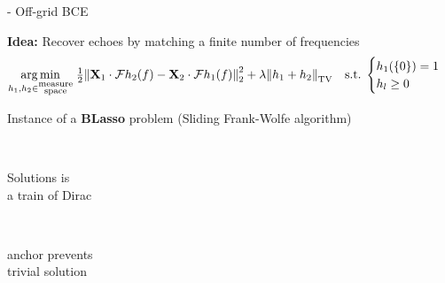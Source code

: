 \begin{frame}{\blaster - Off-grid BCE}
        \begin{block}{\textbf{Idea:} Recover echoes by matching a finite number of frequencies}
        \begin{equation*}
            \underset{h_1,h_2 \in \substack{\text{measure} \\ \text{space}}}{\arg\min} \;
            \tfrac{1}{2} \kvvbar{
                \mathbf{X}_1 \cdot \mathcal{F}h_2 (f) - \mathbf{X}_2 \cdot \mathcal{F}h_1(f)
            }_2^2
            + \lambda \kvvbar{h_1 + h_2}_{\mathrm{TV}}
            \quad
            \text{s.t.}\;
            \begin{cases}
                h_1(\{0\})=1 \\
                h_l \geq 0
                \end{cases}
        \end{equation*}
        \end{block}

        \begin{center}
            Instance of a \textbf{BLasso} problem \cite{Bredies2013} (Sliding Frank-Wolfe algorithm)
        \end{center}

        \begin{center}

            \textcolor{mygreen}{ \qquad \checkmark \, \parbox{8.5em}{Solutions is \\ a train of Dirac} \qquad \checkmark \, \parbox{8em}{anchor prevents \\ trivial solution}}
        \end{center}
\end{frame}

